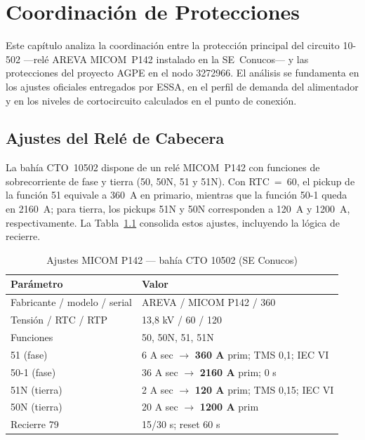 \chapter{Coordinación de Protecciones}

Este capítulo analiza la coordinación entre la protección principal del circuito 10-502 ---relé AREVA MICOM~P142 instalado en la SE~Conucos--- y las protecciones del proyecto AGPE en el nodo 3272966. El análisis se fundamenta en los ajustes oficiales entregados por ESSA, en el perfil de demanda del alimentador y en los niveles de cortocircuito calculados en el punto de conexión.

\section{Ajustes del Relé de Cabecera}

La bahía CTO~10502 dispone de un relé MICOM~P142 con funciones de sobrecorriente de fase y tierra (50, 50N, 51 y 51N). Con RTC~=~60, el pickup de la función 51 equivale a 360~A en primario, mientras que la función 50-1 queda en 2160~A; para tierra, los pickups 51N y 50N corresponden a 120~A y 1200~A, respectivamente. La Tabla~\ref{tab:ajustes_p142} consolida estos ajustes, incluyendo la lógica de recierre.

\begin{table}[H]
    \centering
    \caption{Ajustes MICOM P142 --- bahía CTO 10502 (SE Conucos)}
    \label{tab:ajustes_p142}
    \begin{tabular}{ll}
    \toprule
    \textbf{Parámetro} & \textbf{Valor} \\
    \midrule
    Fabricante / modelo / serial & AREVA / MICOM P142 / 360 \\
    Tensión / RTC / RTP & 13,8 kV / 60 / 120 \\
    Funciones & 50, 50N, 51, 51N \\
    51 (fase) & 6 A sec $\rightarrow$ \textbf{360 A} prim; TMS 0,1; IEC VI \\
    50-1 (fase) & 36 A sec $\rightarrow$ \textbf{2160 A} prim; 0 s \\
    51N (tierra) & 2 A sec $\rightarrow$ \textbf{120 A} prim; TMS 0,15; IEC VI \\
    50N (tierra) & 20 A sec $\rightarrow$ \textbf{1200 A} prim \\
    Recierre 79 & 15/30 s; reset 60 s \\
    \bottomrule
    \end{tabular}
\end{table}


